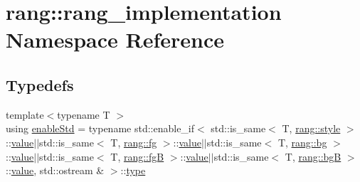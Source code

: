 \hypertarget{namespacerang_1_1rang__implementation}{}\section{rang\+:\+:rang\+\_\+implementation Namespace Reference}
\label{namespacerang_1_1rang__implementation}
\subsection*{Typedefs}
\begin{DoxyCompactItemize}
\item 
{\footnotesize template$<$typename T $>$ }\\using \mbox{\hyperlink{namespacerang_1_1rang__implementation_a769f245caecc8bdf2d741f39a48052ac}{enable\+Std}} = typename std\+::enable\+\_\+if$<$ std\+::is\+\_\+same$<$ T, \mbox{\hyperlink{namespacerang_add4e682fec2856474978ff76efcc8b4e}{rang\+::style}} $>$\+::\mbox{\hyperlink{glad_8h_a7ab00df62abe96de01795dc0d15959db}{value}}$\vert$$\vert$std\+::is\+\_\+same$<$ T, \mbox{\hyperlink{namespacerang_a41a68f6ed991b29fa720fcfbcd319ef9}{rang\+::fg}} $>$\+::\mbox{\hyperlink{glad_8h_a7ab00df62abe96de01795dc0d15959db}{value}}$\vert$$\vert$std\+::is\+\_\+same$<$ T, \mbox{\hyperlink{namespacerang_ad33ed681a0b63f07283bbb55d19da7d2}{rang\+::bg}} $>$\+::\mbox{\hyperlink{glad_8h_a7ab00df62abe96de01795dc0d15959db}{value}}$\vert$$\vert$std\+::is\+\_\+same$<$ T, \mbox{\hyperlink{namespacerang_a3b83d0d73d49b5a75c3b92031f2c77ee}{rang\+::fgB}} $>$\+::\mbox{\hyperlink{glad_8h_a7ab00df62abe96de01795dc0d15959db}{value}}$\vert$$\vert$std\+::is\+\_\+same$<$ T, \mbox{\hyperlink{namespacerang_a42edf1c1b0d8e843ceb1208259177f08}{rang\+::bgB}} $>$\+::\mbox{\hyperlink{glad_8h_a7ab00df62abe96de01795dc0d15959db}{value}}, std\+::ostream \& $>$\+::\mbox{\hyperlink{glad_8h_a890efa53b3d7deeeced6f3a0d6653ed3}{type}}
\end{DoxyCompactItemize}
